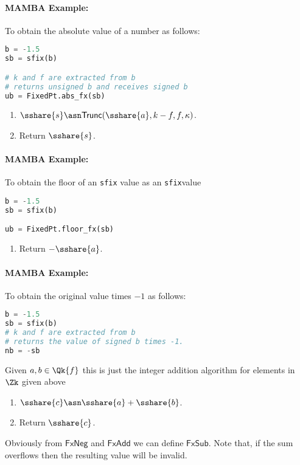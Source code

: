 \paragraph{MAMBA Example:} To obtain the absolute value of a number as follows: 
\begin{lstlisting}[language={python}]
b = -1.5
sb = sfix(b)

# k and f are extracted from b
# returns unsigned b and receives signed b
ub = FixedPt.abs_fx(sb)
\end{lstlisting}

\begin{enumerate}
\item $\sshare{s} \asn \mathsf{Trunc}(\sshare{a}, k-f, f, \kappa)$.
\item Return $\sshare{s}$.
\end{enumerate}

\paragraph{MAMBA Example:} To obtain the floor of an \verb+sfix+ value
as an \verb+sfix+value
\begin{lstlisting}[language={python}]
b = -1.5
sb = sfix(b)

ub = FixedPt.floor_fx(sb)
\end{lstlisting}

\begin{enumerate}
\item Return $-\sshare{a}$.
\end{enumerate}
\paragraph{MAMBA Example:} To obtain the original value times $-1$ as follows: 
\begin{lstlisting}[language={python}]
b = -1.5
sb = sfix(b)
# k and f are extracted from b
# returns the value of signed b times -1.
nb = -sb
\end{lstlisting}
Given $a, b \in \Qk{f}$ this is just the integer addition algorithm for elements
in $\Zk$ given above
\begin{enumerate}
\item $\sshare{c} \asn \sshare{a} + \sshare{b}$.
\item Return $\sshare{c}$.
\end{enumerate}
Obviously from $\mathsf{FxNeg}$ and $\mathsf{FxAdd}$ we can define $\mathsf{FxSub}$.
Note that, if the sum overflows then the resulting value will be
invalid.
